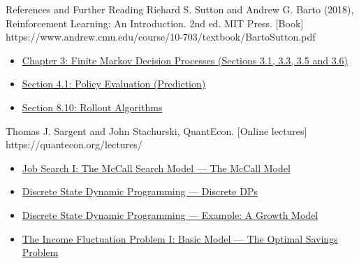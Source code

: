 \begin{frame}{References and Further Reading}
  {Richard S. Sutton and Andrew G. Barto (2018), Reinforcement Learning: An Introduction. 2nd ed. MIT Press. [Book]}
  {https://www.andrew.cmu.edu/course/10-703/textbook/BartoSutton.pdf}
  {\begin{itemize}
\item \href{https://www.andrew.cmu.edu/course/10-703/textbook/BartoSutton.pdf\#page=69}{Chapter 3: Finite Markov Decision Processes (Sections 3.1, 3.3, 3.5 and 3.6)}
\item \href{https://www.andrew.cmu.edu/course/10-703/textbook/BartoSutton.pdf\#page=96}{Section 4.1: Policy Evaluation (Prediction)}
\item \href{https://www.andrew.cmu.edu/course/10-703/textbook/BartoSutton.pdf\#page=205}{Section 8.10: Rollout Algorithms}
\end{itemize}}
  {Thomas J. Sargent and John Stachurski, QuantEcon. [Online lectures]}
  {https://quantecon.org/lectures/}
  {\begin{itemize}
\item \href{https://python.quantecon.org/mccall_model.html\#the-mccall-model}{Job Search I: The McCall Search Model — The McCall Model}
\item \href{https://tools-techniques.quantecon.org/discrete_dp.html\#discrete-dps}{Discrete State Dynamic Programming — Discrete DPs}
\item \href{https://tools-techniques.quantecon.org/discrete_dp.html\#example-a-growth-model}{Discrete State Dynamic Programming — Example: A Growth Model}
\item \href{https://dynamics.quantecon.org/ifp.html\#the-optimal-savings-problem}{The Income Fluctuation Problem I: Basic Model — The Optimal Savings Problem}
\end{itemize}}
\end{frame}

